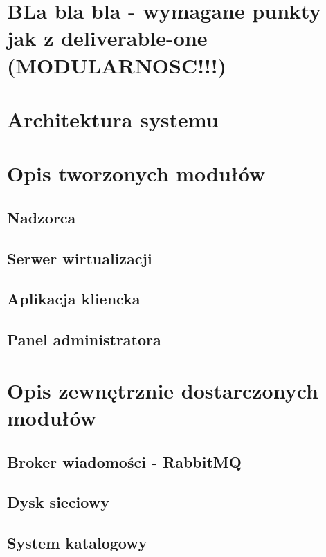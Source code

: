 \documentclass[12pt]{article}
\begin{document}
	
	
\section{BLa bla bla - wymagane punkty jak z deliverable-one (MODULARNOSC!!!)}

\section{Architektura systemu}

\section{Opis tworzonych modułów}

\subsection{Nadzorca}

\subsection{Serwer wirtualizacji}

\subsection{Aplikacja kliencka}

\subsection{Panel administratora}

\section{Opis zewnętrznie dostarczonych modułów}

\subsection{Broker wiadomości - RabbitMQ}

\subsection{Dysk sieciowy}

\subsection{System katalogowy}
\end{document}
